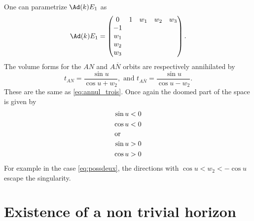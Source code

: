 One can parametrize $\Ad(k)E_1$ as
\begin{equation}
	\Ad(k)E_1=
	\begin{pmatrix}
		0 & 1 & w_1 & w_2 & w_3 \\
		-1                      \\
		w_1                     \\
		w_2                     \\
		w_3
	\end{pmatrix}.
\end{equation}
The volume forms for the $AN$ and $A \overline{N}$ orbits are respectively annihilated by
\begin{equation}
	t_{AN}=\frac{\sin u}{\cos u+w_2}, \text{ and } t_{A \overline{N}}=\frac{\sin u}{\cos u-w_2}.
\end{equation}
These are the same as \eqref{eq:annul_trois}. Once again the doomed part of the space is given by
\begin{subequations}
	\begin{align}
		\begin{split}
			\sin u<0 \\
			\cos u<0
		\end{split} \\
		\intertext{or}
		\begin{split}  \label{eq:possdeux}
			\sin u>0 \\
			\cos u>0
		\end{split}
	\end{align}
\end{subequations}
For example in the case \eqref{eq:possdeux}, the directions with $\cos u<w_2<-\cos u$ escape the singularity.
\section{Existence of a non trivial horizon}		\label{SecExistenceHor}

